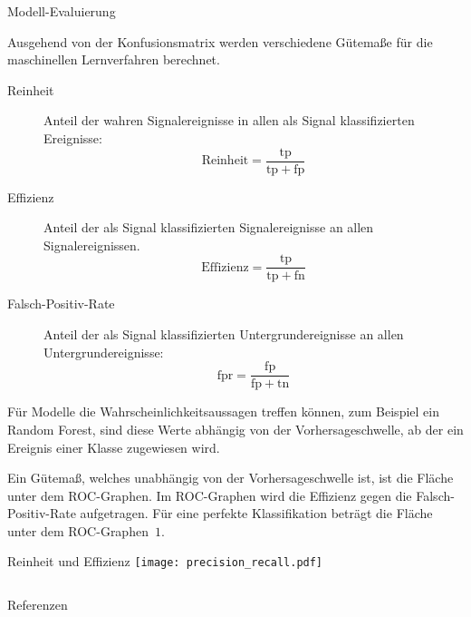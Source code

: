 \documentclass[t]{beamer}
\begin{document}
\begin{columns}[onlytextwidth]
\begin{column}{0.5\textwidth}
\begin{block}{Modell-Evaluierung}
\begin{multicols}{2}
          Ausgehend von der Konfusionsmatrix werden verschiedene Gütemaße für die maschinellen
          Lernverfahren berechnet.
          \begin{description}
            \item[Reinheit] Anteil der wahren Signalereignisse in allen als Signal klassifizierten
              Ereignisse:
              \begin{equation}
                \mathrm{Reinheit} = \frac{\mathrm{tp}}{\mathrm{tp} + \mathrm{fp}}
              \end{equation}
            \item[Effizienz] Anteil der als Signal klassifizierten Signalereignisse an
              allen Signalereignissen.
              \begin{equation}
                \mathrm{Effizienz} = \frac{\mathrm{tp}}{\mathrm{tp} + \mathrm{fn}}
              \end{equation}
            \item[Falsch-Positiv-Rate] Anteil der als Signal klassifizierten Untergrundereignisse
              an allen Untergrundereignisse:
              \begin{equation}
                \mathrm{fpr} = \frac{\mathrm{fp}}{\mathrm{fp} + \mathrm{tn}}
              \end{equation}
          \end{description}

          Für Modelle die Wahrscheinlichkeitsaussagen treffen können, zum Beispiel
          ein Random Forest, sind diese Werte abhängig von der Vorhersageschwelle, ab
          der ein Ereignis einer Klasse zugewiesen wird.

          Ein Gütemaß, welches unabhängig von der Vorhersageschwelle ist, ist die Fläche
          unter dem ROC-Graphen. Im ROC-Graphen wird die Effizienz gegen die Falsch-Positiv-Rate
          aufgetragen.
          Für eine perfekte Klassifikation beträgt die Fläche unter dem ROC-Graphen~$1$.
        \end{multicols}
      \end{block}
      \begin{block}{Reinheit und Effizienz}
        \texttt{[image: precision\_recall.pdf]}
      \end{block}
    \end{column}%
  \end{columns}%

  \vspace*{\fill}
  \begin{block}[equal height group=bottom, fonttitle=\normalsize]{Referenzen}
    \begin{multicols}{3}
      \nocite{*}\footnotesize%
      \printbibliography%
    \end{multicols}
  \end{block}
\end{document}
